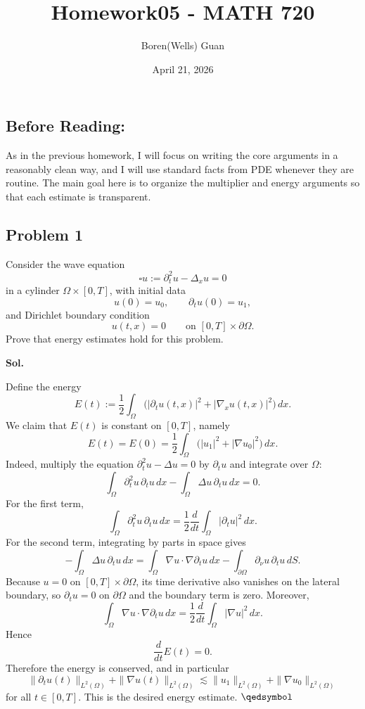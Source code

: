 \documentclass[lang=en,11pt,a4paper,citestyle=authoryear]{elegantpaper}
\title{Homework05 - MATH 720}
\author{Boren(Wells) Guan}
\date{April 21, 2026}
\newcommand{\prvd}{$\hfill \qedsymbol$}
\newcommand{\Boxop}{\square}
\newcommand{\1}{\mathbbm{1}}
\begin{document}
\maketitle

\subsection*{Before Reading:}\par
As in the previous homework, I will focus on writing the core arguments in a reasonably clean way, and I will use standard facts from PDE whenever they are routine. The main goal here is to organize the multiplier and energy arguments so that each estimate is transparent.

\subsection*{Problem 1}
Consider the wave equation
\[
\Boxop u:=\partial_t^2u-\Delta_xu=0
\]
in a cylinder $\Omega\times[0,T]$, with initial data
\[
u(0)=u_0,\qquad \partial_tu(0)=u_1,
\]
and Dirichlet boundary condition
\[
u(t,x)=0\qquad \text{on }[0,T]\times\partial\Omega.
\]
Prove that energy estimates hold for this problem.

\vspace{0.5em}
\textbf{Sol.} \par
Define the energy
\[
E(t):=\frac12\int_\Omega \bigl(|\partial_tu(t,x)|^2+|\nabla_xu(t,x)|^2\bigr)\,dx.
\]
We claim that $E(t)$ is constant on $[0,T]$, namely
\[
E(t)=E(0)=\frac12\int_\Omega \bigl(|u_1|^2+|\nabla u_0|^2\bigr)\,dx.
\]
Indeed, multiply the equation $\partial_t^2u-\Delta u=0$ by $\partial_tu$ and integrate over $\Omega$:
\[
\int_\Omega \partial_t^2u\,\partial_tu\,dx-\int_\Omega \Delta u\,\partial_tu\,dx=0.
\]
For the first term,
\[
\int_\Omega \partial_t^2u\,\partial_tu\,dx=\frac12\frac{d}{dt}\int_\Omega |\partial_tu|^2\,dx.
\]
For the second term, integrating by parts in space gives
\[
-\int_\Omega \Delta u\,\partial_tu\,dx
=\int_\Omega \nabla u\cdot \nabla\partial_tu\,dx-\int_{\partial\Omega}\partial_\nu u\,\partial_tu\,dS.
\]
Because $u=0$ on $[0,T]\times\partial\Omega$, its time derivative also vanishes on the lateral boundary, so $\partial_tu=0$ on $\partial\Omega$ and the boundary term is zero. Moreover,
\[
\int_\Omega \nabla u\cdot \nabla\partial_tu\,dx
=\frac12\frac{d}{dt}\int_\Omega |\nabla u|^2\,dx.
\]
Hence
\[
\frac{d}{dt}E(t)=0.
\]
Therefore the energy is conserved, and in particular
\[
\|\partial_tu(t)\|_{L^2(\Omega)}+\|\nabla u(t)\|_{L^2(\Omega)}
\lesssim \|u_1\|_{L^2(\Omega)}+\|\nabla u_0\|_{L^2(\Omega)}
\]
for all $t\in[0,T]$. This is the desired energy estimate. \prvd
\end{document}
